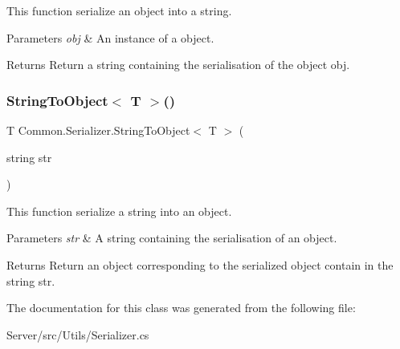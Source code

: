 This function serialize an object into a string. 
\begin{DoxyParams}{Parameters}
{\em obj} & An instance of a object. \\
\hline
\end{DoxyParams}
\begin{DoxyReturn}{Returns}
Return a string containing the serialisation of the object obj. 
\end{DoxyReturn}
\mbox{\label{class_common_1_1_serializer_a639df2c61bf2912b65c66a6c1f9e96dc}} 
\subsubsection{\texorpdfstring{String\+To\+Object$<$ T $>$()}{StringToObject< T >()}}
{\footnotesize\ttfamily T Common.\+Serializer.\+String\+To\+Object$<$ T $>$ (\begin{DoxyParamCaption}\item[{string}]{str }\end{DoxyParamCaption})\hspace{0.3cm}{\ttfamily [inline]}}

This function serialize a string into an object. 
\begin{DoxyParams}{Parameters}
{\em str} & A string containing the serialisation of an object. \\
\hline
\end{DoxyParams}
\begin{DoxyReturn}{Returns}
Return an object corresponding to the serialized object contain in the string str. 
\end{DoxyReturn}


The documentation for this class was generated from the following file\+:\begin{DoxyCompactItemize}
\item 
Server/src/\+Utils/Serializer.\+cs\end{DoxyCompactItemize}
